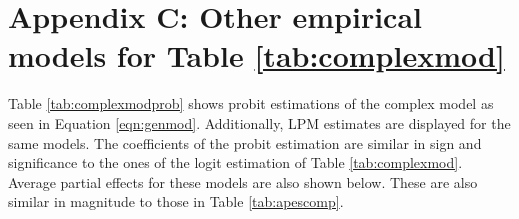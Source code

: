 \documentclass[12pt,a4]{article}\usepackage[]{graphicx}\usepackage[]{xcolor}
\begin{document}



\section{Appendix C: Other empirical models for Table \ref{tab:complexmod}}
\label{app:third}

Table \ref{tab:complexmodprob} shows probit estimations of the complex model as seen in Equation \ref{eqn:genmod}. Additionally, LPM estimates are displayed for the same models. The coefficients of the probit estimation are similar in sign and significance to the ones of the logit estimation of Table \ref{tab:complexmod}. Average partial effects for these models are also shown below. These are also similar in magnitude to those in Table \ref{tab:apescomp}. 
\end{document}
